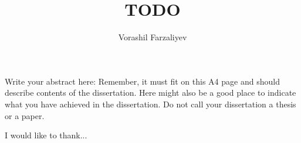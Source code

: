 \title{TODO}

\author{Vorashil Farzaliyev}


\beforeabstract

Write your abstract here: Remember, it must fit on this A4 page and should
describe contents of the dissertation. Here might also be a good place
to indicate what you have achieved in the dissertation. Do not call your dissertation a thesis or a paper.


\afterabstract

I would like to thank...

\afterpreface
